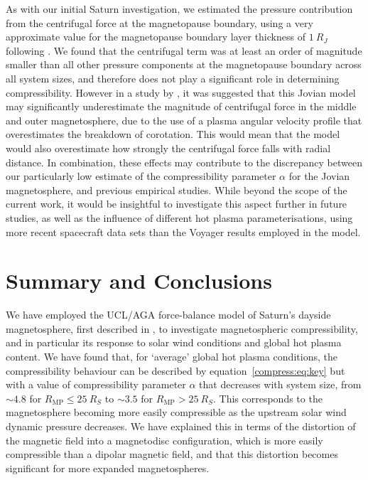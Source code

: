 As with our initial Saturn investigation, we estimated the pressure contribution from the centrifugal force at the magnetopause boundary, using a very approximate value for the magnetopause boundary layer thickness of $\SI{1}{R_J}$ following \citet{delamere2010}. We found that the centrifugal term was at least an order of magnitude smaller than all other pressure components at the magnetopause boundary across all system sizes, and therefore does not play a significant role in determining compressibility. However in a study by \citet{nichols2011}, it was suggested that this Jovian model may significantly underestimate the magnitude of centrifugal force in the middle and outer magnetosphere, due to the use of a plasma angular velocity profile that overestimates the breakdown of corotation. This would mean that the model would also overestimate how strongly the centrifugal force falls with radial distance. In combination, these effects may contribute to the discrepancy between our particularly low estimate of the compressibility parameter $\alpha$ for the Jovian magnetosphere, and previous empirical studies. While beyond the scope of the  current work,  it  would be insightful to investigate this aspect further in future studies, as well as the influence of different hot plasma parameterisations, using more recent spacecraft data sets than the Voyager results employed in the \citet{caudal1986} model.

\section{Summary and Conclusions}
We have employed the UCL/AGA force-balance model of Saturn's dayside magnetosphere, first described in \citet{achilleos2010a}, to investigate magnetospheric compressibility, and in particular its response to solar wind conditions and global hot plasma content. We have found that, for `average' global hot plasma conditions, the compressibility behaviour can be described by equation~\ref{compress:eq:key} but with a value of compressibility parameter $\alpha$ that decreases with system size, from ${\sim}4.8$ for $R_\mathrm{MP} \leq \SI{25}{R_S}$ to ${\sim}3.5$ for $R_\mathrm{MP} > \SI{25}{R_S}$. This corresponds to the magnetosphere becoming more easily compressible as the upstream solar wind dynamic pressure decreases. We have explained this in terms of the distortion of the magnetic field into a magnetodisc configuration, which is more easily compressible than a dipolar magnetic field, and that this distortion becomes significant for more expanded magnetospheres. 

